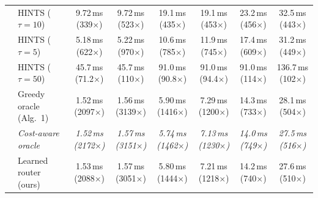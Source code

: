 {\begin{tabular}{llcccccc}
 & HINTS ($\tau{=}10$) & 9.72\,ms (339$\times$) & 9.72\,ms (523$\times$) & 19.1\,ms (435$\times$) & 19.1\,ms (453$\times$) & 23.2\,ms (456$\times$) & 32.5\,ms (443$\times$) \\
 & HINTS ($\tau{=}5$) & 5.18\,ms (622$\times$) & 5.22\,ms (970$\times$) & 10.6\,ms (785$\times$) & 11.9\,ms (745$\times$) & 17.4\,ms (609$\times$) & 31.2\,ms (449$\times$) \\
 & HINTS ($\tau{=}50$) & 45.7\,ms (71.2$\times$) & 45.7\,ms (110$\times$) & 91.0\,ms (90.8$\times$) & 91.0\,ms (94.4$\times$) & 91.0\,ms (114$\times$) & 136.7\,ms (102$\times$) \\
 & Greedy oracle (Alg.~1) & 1.52\,ms (2097$\times$) & 1.56\,ms (3139$\times$) & 5.90\,ms (1416$\times$) & 7.29\,ms (1200$\times$) & 14.3\,ms (733$\times$) & 28.1\,ms (504$\times$) \\
 & \textit{Cost-aware oracle} & \textit{1.52\,ms (2172$\times$)} & \textit{1.57\,ms (3151$\times$)} & \textit{5.74\,ms (1462$\times$)} & \textit{7.13\,ms (1230$\times$)} & \textit{14.0\,ms (749$\times$)} & \textit{27.5\,ms (516$\times$)} \\
 & Learned router (ours) & 1.53\,ms (2088$\times$) & 1.57\,ms (3051$\times$) & 5.80\,ms (1444$\times$) & 7.21\,ms (1218$\times$) & 14.2\,ms (740$\times$) & 27.6\,ms (510$\times$) \\
\bottomrule
\end{tabular}}

